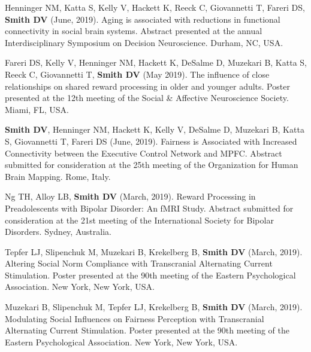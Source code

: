 \documentclass[11pt, letterpaper]{article}
\begin{document}
\begin{hangparas}{.5in}{1}
Henninger NM, Katta S, Kelly V, Hackett K,  Reeck C, Giovannetti T, Fareri DS, \textbf{Smith DV} (June, 2019). Aging is associated with reductions in functional connectivity in social brain systems. Abstract presented at the annual Interdisciplinary Symposium on Decision Neuroscience. Durham, NC, USA.

Fareri DS, Kelly V, Henninger NM, Hackett K, DeSalme D, Muzekari B, Katta S, Reeck C, Giovannetti T, \textbf{Smith DV} (May 2019). The influence of close relationships on shared reward processing in older and younger adults. Poster presented at the 12th meeting of the Social \& Affective Neuroscience Society. Miami, FL, USA.

\textbf{Smith DV}, Henninger NM, Hackett K, Kelly V, DeSalme D, Muzekari B, Katta S, Giovannetti T, Fareri DS (June, 2019). Fairness is Associated with Increased Connectivity between the Executive Control Network and MPFC. Abstract submitted for consideration at the 25th meeting of the Organization for Human Brain Mapping. Rome, Italy.

Ng TH, Alloy LB, \textbf{Smith DV} (March, 2019). Reward Processing in Preadolescents with Bipolar Disorder: An fMRI Study. Abstract submitted for consideration at the 21st meeting of the International Society for Bipolar Disorders. Sydney, Australia.

Tepfer LJ, Slipenchuk M, Muzekari B, Krekelberg B, \textbf{Smith DV} (March, 2019). Altering Social Norm Compliance with Transcranial Alternating Current Stimulation. Poster presented at the 90th meeting of the Eastern Psychological Association. New York, New York, USA.

Muzekari B, Slipenchuk M, Tepfer LJ, Krekelberg B, \textbf{Smith DV} (March, 2019). Modulating Social Influences on Fairness Perception with Transcranial Alternating Current Stimulation. Poster presented at the 90th meeting of the Eastern Psychological Association. New York, New York, USA. \\

\end{hangparas}
\end{document}
